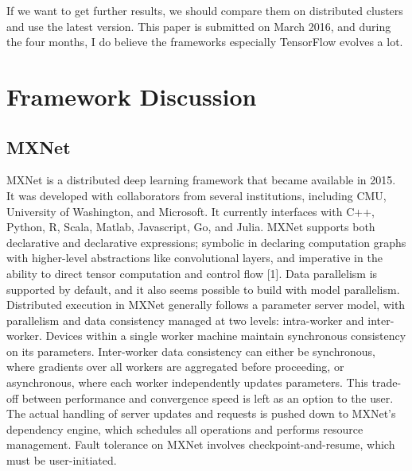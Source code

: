 \documentclass{article}
\begin{document}
If we want to get further results, we should compare them on distributed clusters and use the latest version. This paper is submitted on March 2016, and during the four months, I do believe the frameworks especially TensorFlow evolves a lot.

\section{Framework Discussion}
\subsection{MXNet}
MXNet is a distributed deep learning framework that became available in 2015. It was developed with collaborators from several institutions, including CMU, University of Washington, and Microsoft. It currently interfaces with C++, Python, R, Scala, Matlab, Javascript, Go, and Julia. MXNet supports both declarative and declarative expressions; symbolic in declaring computation graphs with higher-level abstractions like convolutional layers, and imperative in the ability to direct tensor computation and control flow [1]. Data parallelism is supported by default, and it also seems possible to build with model parallelism. Distributed execution in MXNet generally follows a parameter server model, with parallelism and data consistency managed at two levels: intra-worker and inter-worker. Devices within a single worker machine maintain synchronous consistency on its parameters. Inter-worker data consistency can either be synchronous, where gradients over all workers are aggregated before proceeding, or asynchronous, where each worker independently updates parameters. This trade-off between performance and convergence speed is left as an option to the user. The actual handling of server updates and requests is pushed down to MXNet's dependency engine, which schedules all operations and performs resource management. Fault tolerance on MXNet involves checkpoint-and-resume, which must be user-initiated. 
\end{document}
